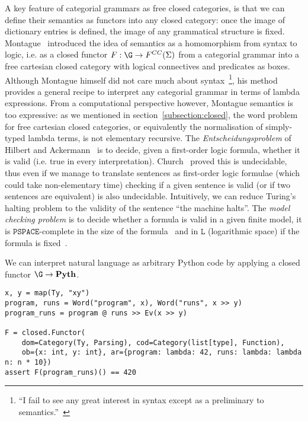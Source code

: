 A key feature of categorial grammars as free closed categories, is that we can define their semantics as functors into any closed category: once the image of dictionary entries is defined, the image of any grammatical structure is fixed.
Montague~\cite{Montague70a,Montague70,Montague73} introduced the idea of semantics as a homomorphism from syntax to logic, i.e. as a closed functor $F : \G \to F^{CC}(\Sigma)$ from a categorial grammar into a free cartesian closed category with logical connectives and predicates as boxes.
Although Montague himself did not care much about syntax~\footnote
{``I fail to see any great interest in syntax except as a preliminary to semantics.''~\cite{Montague70a}},
his method provides a general recipe to interpret any categorial grammar in terms of lambda expressions.
From a computational perspective however, Montague semantics is too expressive: as we mentioned in section~\ref{subsection:closed}, the word problem for free cartesian closed categories, or equivalently the normalisation of simply-typed lambda terms, is not elementary recursive.
The \emph{Entscheidungsproblem} of Hilbert and Ackermann~\cite{HilbertAckerman28} is to decide, given a first-order logic formula, whether it is valid (i.e. true in every interpretation).
Church~\cite{Church36} proved this is undecidable, thus even if we manage to translate sentences as first-order logic formulae (which could take non-elementary time) checking if a given sentence is valid (or if two sentences are equivalent) is also undecidable.
Intuitively, we can reduce Turing's halting problem to the validity of the sentence ``the machine halts''.
The \emph{model checking problem} is to decide whether a formula is valid in a given finite model, it is $\mathtt{PSPACE}$-complete in the size of the formula~\cite[Theorem~4.3]{Gradel02} and in $\mathtt{L}$ (logarithmic space) if the formula is fixed~\cite[Corollary~4.5]{Gradel02}.

\begin{example}
We can interpret natural language as arbitrary Python code by applying a closed functor $\G \to \mathbf{Pyth}$.

\begin{verbatim}
x, y = map(Ty, "xy")
program, runs = Word("program", x), Word("runs", x >> y)
program_runs = program @ runs >> Ev(x >> y)

F = closed.Functor(
    dom=Category(Ty, Parsing), cod=Category(list[type], Function),
    ob={x: int, y: int}, ar={program: lambda: 42, runs: lambda: lambda n: n * 10})
assert F(program_runs)() == 420
\end{verbatim}
\end{example}


